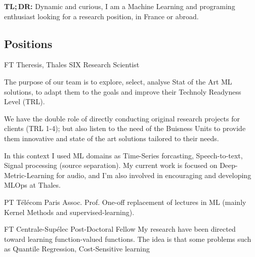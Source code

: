 \documentclass[10pt]{article} %
\begin{document}
\begin{center}
    \textbf{TL;\,DR:} Dynamic and curious, I am a Machine Learning and
    programing enthusiast looking for a research position, in France or abroad.
\end{center}
\medskip
\begin{paracol}{2}
%
%
\section{Positions}
%
%
%
%
%
{FT} %
{Theresis, Thales SIX} %
{Research Scientist} %
{The purpose of our team is to explore, select, analyse Stat of the Art
  ML solutions, to adapt them to the goals and improve their Technoly
  Readyness Level (TRL). \par
  We have the double role of directly conducting original research
  projects for clients (TRL 1-4); but also listen to the need of the
  Buisness Units to provide them innovative and state of the art
  solutions tailored to their needs.  \par
  In this context I used ML domains as Time-Series forcasting,
  Speech-to-text, Signal processing (source separation). My current work
  is focused on Deep-Metric-Learning for audio, and I'm also involved in
  encouraging and developing MLOps at Thales.}\par %
{PT} %
{T\'el\'ecom Paris} %
{Assoc. Prof.} %
{One-off replacement of lectures in ML (mainly Kernel Methods and
  supervised-learning).}\par
{} %
{FT} %
{Centrale-Sup\'elec} %
{Post-Doctoral Fellow} %
{My research have been directed toward learning function-valued functions. The
idea is that some problems such as Quantile Regression, Cost-Sensitive learning
}
\end{paracol}
\end{document}
